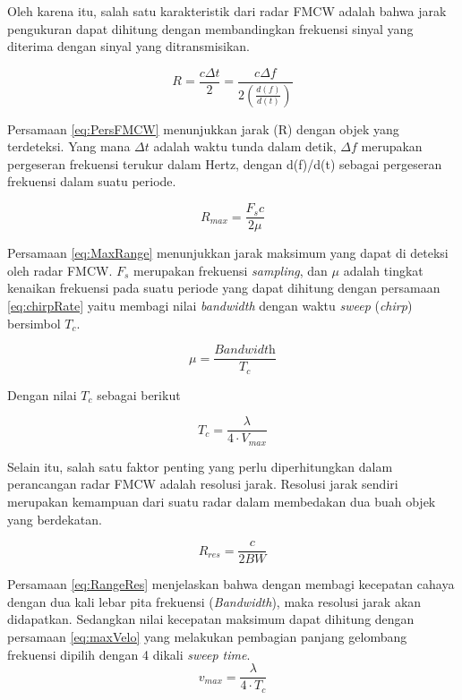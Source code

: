 Oleh karena itu, salah satu karakteristik dari radar FMCW adalah bahwa jarak pengukuran dapat dihitung dengan membandingkan frekuensi sinyal yang diterima dengan sinyal yang ditransmisikan.   

\begin{equation} 
	R = \frac{c \Delta{t}}{2} = \frac{c \Delta{f}}{2(\frac{d(f)}{d(t)})}
	\label{eq:PersFMCW}
\end{equation}

Persamaan \ref{eq:PersFMCW} menunjukkan jarak (R) dengan objek yang terdeteksi. Yang mana $\Delta{t}$ adalah waktu tunda dalam detik, $\Delta{f}$ merupakan pergeseran frekuensi terukur dalam Hertz, dengan d(f)/d(t) sebagai pergeseran frekuensi dalam suatu periode. 

\begin{equation}
	R_{max} = \frac{F_{s} c}{2 \mu}
	\label{eq:MaxRange}
\end{equation}

Persamaan \ref{eq:MaxRange} menunjukkan jarak maksimum yang dapat di deteksi oleh radar FMCW. $F_{s}$ merupakan frekuensi \textit{sampling}, dan $\mu$ adalah tingkat kenaikan frekuensi pada suatu periode yang dapat dihitung dengan persamaan \ref{eq:chirpRate} yaitu membagi nilai \textit{bandwidth} dengan waktu \textit{sweep} (\textit{chirp}) bersimbol $T_{c}$.

\begin{equation}
	\mu = \frac{\textit{Bandwidth}}{T_{c}}
	\label{eq:chirpRate}
\end{equation}

Dengan nilai $T_{c}$ sebagai berikut

\begin{equation}
	T_{c} = \frac{\lambda}{4 \cdot V_{max}}
	\label{eq:chirpTime}
\end{equation}

Selain itu, salah satu faktor penting yang perlu diperhitungkan dalam perancangan radar FMCW adalah resolusi jarak. Resolusi jarak sendiri merupakan kemampuan dari suatu radar dalam membedakan dua buah objek yang berdekatan.

\begin{equation}
	R_{res} = \frac{c}{2 BW}
	\label{eq:RangeRes}
\end{equation}

Persamaan \ref{eq:RangeRes} menjelaskan bahwa dengan membagi kecepatan cahaya dengan dua kali lebar pita frekuensi (\textit{Bandwidth}), maka resolusi jarak akan didapatkan. Sedangkan nilai kecepatan maksimum dapat dihitung dengan persamaan \ref{eq:maxVelo} yang melakukan pembagian panjang gelombang frekuensi dipilih dengan 4 dikali \textit{sweep time}.
\begin{equation}
	v_{max} = \frac{\lambda}{4 \cdot T_{c}}
	\label{eq:maxVelo}
\end{equation}

